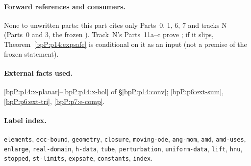 \paragraph{Forward references and consumers.} None to unwritten parts: this part cites only Parts~0, 1, 6, 7 and tracks N (Parts~0 and 3, the frozen ). Track~N's Parts~11a--c prove ; if it slips, Theorem~\ref{bpP:p14:expsafe} is conditional on it as an input (not a premise of the frozen statement).

\paragraph{External facts used.} \ref{bpP:p14:x-planar}--\ref{bpP:p14:x-hol} of \S\ref{bpP:p14:conv}; \ref{bpP:p6:ext-sum}, \ref{bpP:p6:ext-tri}, \ref{bpP:p7:e-comp}.

\paragraph{Label index.} \texttt{elements}, \texttt{ecc-bound}, \texttt{geometry}, \texttt{closure}, \texttt{moving-ode}, \texttt{ang-mom}, \texttt{amd}, \texttt{amd-uses}, \texttt{enlarge}, \texttt{real-domain}, \texttt{h-data}, \texttt{tube}, \texttt{perturbation}, \texttt{uniform-data}, \texttt{lift}, \texttt{hnu}, \texttt{stopped}, \texttt{st-limits}, \texttt{expsafe}, \texttt{constants}, \texttt{index}.
\endgroup
